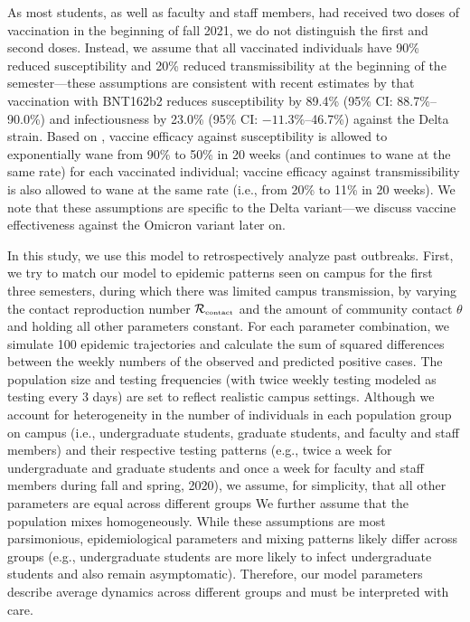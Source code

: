 \documentclass[12pt]{article}
\newcommand{\Rx}[1]{\ensuremath{{\mathcal R}_{#1}}}
\newcommand{\Rc}{\Rx{\textrm{\tiny{contact}}}}
\begin{document}
As most students, as well as faculty and staff members, had received two doses of vaccination in the beginning of fall 2021, we do not distinguish the first and second doses.
Instead, we assume that all vaccinated individuals have 90\% reduced susceptibility and 20\% reduced transmissibility at the beginning of the semester---these assumptions are consistent with recent estimates by \cite{prunas2022vaccination} that vaccination with BNT162b2 reduces susceptibility by 89.4\% (95\% CI: 88.7\%--90.0\%) and infectiousness by 23.0\% (95\% CI: $-11.3\%$--46.7\%) against the Delta strain.
Based on \cite{tartof2021effectiveness}, vaccine efficacy against susceptibility is allowed to exponentially wane from 90\% to 50\% in 20 weeks (and continues to wane at the same rate) for each vaccinated individual;
vaccine efficacy against transmissibility is also allowed to wane at the same rate (i.e., from 20\% to 11\% in 20 weeks).
We note that these assumptions are specific to the Delta variant---we discuss vaccine effectiveness against the Omicron variant later on.

In this study, we use this model to retrospectively analyze past outbreaks.
First, we try to match our model to epidemic patterns seen on campus for the first three semesters, during which there was limited campus transmission, by varying the contact reproduction number $\Rc$ and the amount of community contact $\theta$ and holding all other parameters constant.
For each parameter combination, we simulate 100 epidemic trajectories and calculate the sum of squared differences between the weekly numbers of the observed and predicted positive cases.
The population size and testing frequencies (with twice weekly testing modeled as testing every 3 days) are set to reflect realistic campus settings.
Although we account for heterogeneity in the number of individuals in each population group on campus (i.e., undergraduate students, graduate students, and faculty and staff members) and their respective testing patterns (e.g., twice a week for undergraduate and graduate students and once a week for faculty and staff members during fall and spring, 2020), we assume, for simplicity, that all other parameters are equal across different groups 
We further assume that the population mixes homogeneously.
While these assumptions are most parsimonious, epidemiological parameters and mixing patterns likely differ across groups (e.g., undergraduate students are more likely to infect undergraduate students and also remain asymptomatic).
Therefore, our model parameters describe average dynamics across different groups and must be interpreted with care.
\end{document}
